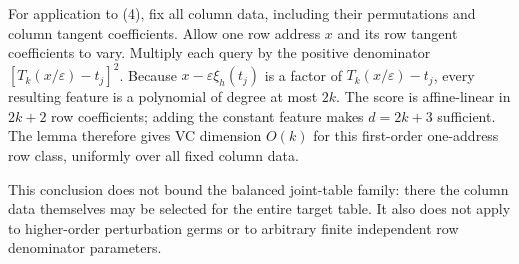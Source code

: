\documentclass[11pt]{article}
\begin{document}
For application to (4), fix all column data, including their
permutations and column tangent coefficients. Allow one row address
$x$ and its row tangent coefficients to vary. Multiply each query by
the positive denominator $[T_k(x/\varepsilon)-t_j]^2$.
Because $x-\varepsilon\xi_h(t_j)$ is a factor of
$T_k(x/\varepsilon)-t_j$, every resulting feature is a polynomial of
degree at most $2k$. The score is affine-linear in $2k+2$ row
coefficients; adding the constant feature makes $d=2k+3$ sufficient.
The lemma therefore gives VC dimension $O(k)$ for this first-order
one-address row class, uniformly over all fixed column data.

This conclusion does not bound the balanced joint-table family:
there the column data themselves may be selected for the entire
target table. It also does not apply to higher-order perturbation
germs or to arbitrary finite independent row denominator parameters.
\end{document}
